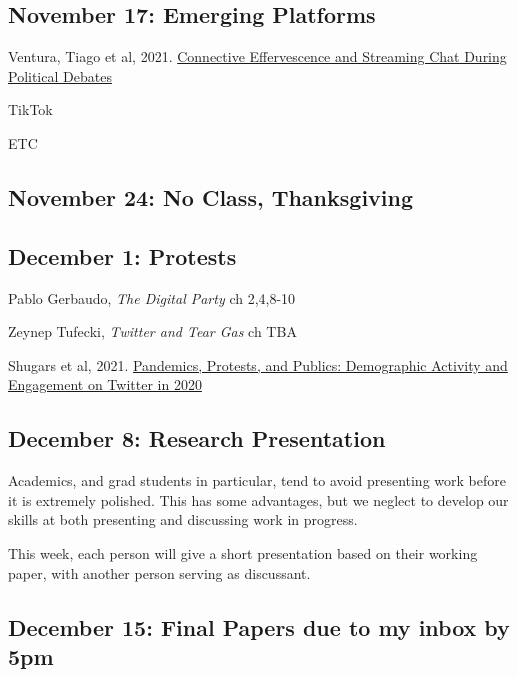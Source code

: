\vspace{-.1in}\documentclass[11pt]{article}
\begin{document}


\subsection*{November 17: Emerging Platforms}


Ventura, Tiago et al, 2021. \href{https://journalqd.org/article/view/2573/1820}{Connective Effervescence and Streaming Chat During Political Debates}

\noindent TikTok

\noindent ETC



\subsection*{November 24: No Class, Thanksgiving}

\subsection*{December 1:  Protests}

Pablo Gerbaudo, \textit{The Digital Party} ch 2,4,8-10

Zeynep Tufecki, \textit{Twitter and Tear Gas} ch TBA

\noindent Shugars et al, 2021. \href{https://journalqd.org/article/view/2570}{Pandemics, Protests, and Publics: Demographic Activity and Engagement on Twitter in 2020}




\subsection*{December 8: Research Presentation}

Academics, and grad students in particular, tend to avoid presenting work before it is extremely polished. This has some advantages, but we neglect to develop our skills at both presenting and discussing work in progress. 

This week, each person will give a short presentation based on their working paper, with another person serving as discussant.

\subsection*{December 15: Final Papers due to my inbox by 5pm}



\end{document}
